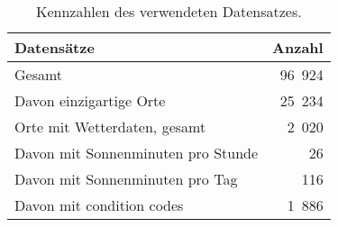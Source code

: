 \begin{table}[t]
    \caption{Kennzahlen des verwendeten Datensatzes.}
    \label{tab:data}
    \centering
    \small
    \begin{tabular}{l r}
        \toprule
        Datensätze & Anzahl\\
        \midrule
        Gesamt & 96~924\\
        Davon einzigartige Orte & 25~234\\
        \midrule
        Orte mit Wetterdaten, gesamt & 2~020\\
        Davon mit Sonnenminuten pro Stunde & 26\\
        Davon mit Sonnenminuten pro Tag & 116\\
        Davon mit condition codes & 1~886\\
        \bottomrule
    \end{tabular}
\end{table}